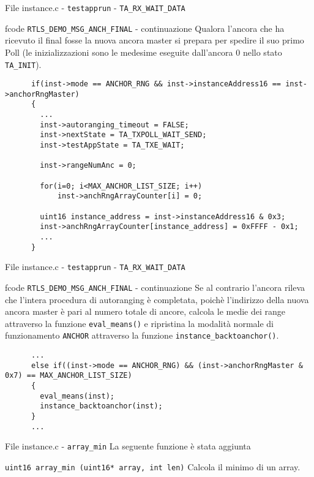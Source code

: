 \begin{frame}[fragile, shrink=30]{File instance.c - \lstinline!testapprun! - \lstinline!TA_RX_WAIT_DATA!}
  \begin{block}{fcode \lstinline!RTLS_DEMO_MSG_ANCH_FINAL! - continuazione}
    Qualora l'ancora che ha ricevuto il final fosse la nuova ancora master
    si prepara per spedire il suo primo Poll (le inizializzazioni sono le medesime
    eseguite dall'ancora 0 nello stato \lstinline!TA_INIT!).
    \begin{lstlisting}
      if(inst->mode == ANCHOR_RNG && inst->instanceAddress16 == inst->anchorRngMaster)
      {
        ...
        inst->autoranging_timeout = FALSE;
        inst->nextState = TA_TXPOLL_WAIT_SEND;
        inst->testAppState = TA_TXE_WAIT;
        
        inst->rangeNumAnc = 0;

        for(i=0; i<MAX_ANCHOR_LIST_SIZE; i++)
            inst->anchRngArrayCounter[i] = 0;

        uint16 instance_address = inst->instanceAddress16 & 0x3;
        inst->anchRngArrayCounter[instance_address] = 0xFFFF - 0x1;
        ...
      }
    \end{lstlisting}
  \end{block}
\end{frame}

\begin{frame}[fragile]{File instance.c - \lstinline!testapprun! - \lstinline!TA_RX_WAIT_DATA!}
  \begin{block}{fcode \lstinline!RTLS_DEMO_MSG_ANCH_FINAL! - continuazione}
    Se al contrario l'ancora rileva che l'intera procedura di autoranging è completata,
    poichè l'indirizzo della nuova ancora master è pari al numero totale di ancore, calcola le medie
    dei range attraverso la funzione \lstinline!eval_means()! e ripristina la modalità normale di funzionamento
    \lstinline!ANCHOR! attraverso la funzione \lstinline!instance_backtoanchor()!.
    \begin{lstlisting}
      ...
      else if((inst->mode == ANCHOR_RNG) && (inst->anchorRngMaster & 0x7) == MAX_ANCHOR_LIST_SIZE)
      {
        eval_means(inst);
        instance_backtoanchor(inst);
      }
      ...
    \end{lstlisting}
  \end{block}
\end{frame}

\begin{frame}[fragile]{File instance.c - \lstinline!array_min!}
  La seguente funzione è stata aggiunta
  \begin{block}{\lstinline!uint16 array_min (uint16* array, int len)!}
    Calcola il minimo di un array.
  \end{block}
\end{frame}
